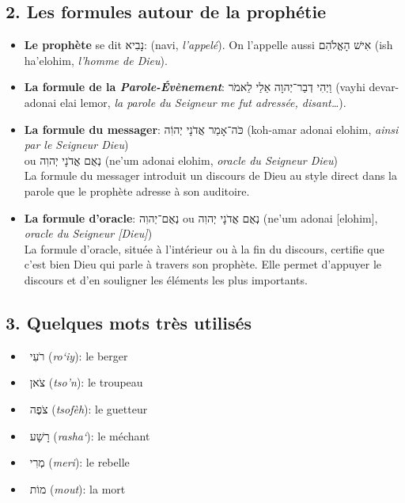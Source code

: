 \subsection*{2. Les formules autour de la prophétie}
\begin{itemize}[label=]
    \item \textbf{Le prophète} se dit \texthebrew{נָבִיא}: (navi, \textit{l'appelé}). On l'appelle aussi \texthebrew{אִישׁ הָאֱלֹהִם} (ish ha’elohim, \textit{l'homme de Dieu}).
    \item \textbf{La formule de la \textit{Parole-Évènement}}: \texthebrew{וַיְהִי דְבַר־יְהוָה אֵלַי לֵאמֹר} (vayhi devar-adonai elai lemor, \textit{la parole du Seigneur me fut adressée, disant…}).
    \item \textbf{La formule du messager}: \texthebrew{כֹּה־אָמַר אֲדֹנָי יְהוִֹה} (koh-amar adonai elohim, \textit{ainsi par le Seigneur Dieu}) \\ ou \texthebrew{נְאֻם אֲדֹנָי יְהוִה} (ne’um adonai elohim, \textit{oracle du Seigneur Dieu}) \\
          La formule du messager introduit un discours de Dieu au style direct dans la parole que le prophète adresse à son auditoire.
    \item \textbf{La formule d'oracle}: \texthebrew{נְאֻם־יְהוִה} ou \texthebrew{נְאֻם אֲדֹנָי יְהוִה} (ne’um adonai [elohim], \textit{oracle du Seigneur [Dieu]})\\
          La formule d'oracle, située à l'intérieur ou à la fin du discours, certifie que c'est bien Dieu qui parle à travers son prophète. Elle permet d'appuyer le discours et d'en souligner les éléments les plus importants.
\end{itemize}

\subsection*{3. Quelques mots très utilisés}
\begin{itemize}[label=]
    \item ~\texthebrew{רֹעִי} (\textit{ro‘iy}): le berger
    \item ~\texthebrew{צֹאן} (\textit{tso'n}): le troupeau
    \item ~\texthebrew{צֹפֶה} (\textit{tsofèh}): le guetteur
    \item ~\texthebrew{רָשָׁע} (\textit{rasha‘}): le méchant
    \item ~\texthebrew{מְרִי} (\textit{meri}): le rebelle
    \item ~\texthebrew{מוֹת} (\textit{mout}): la mort
\end{itemize}